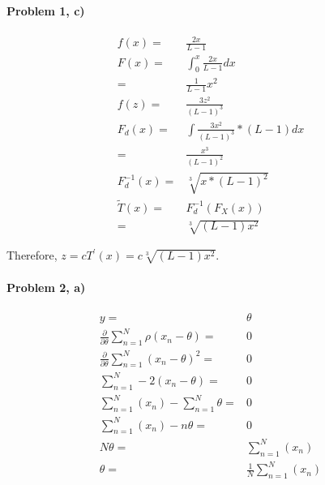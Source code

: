 \documentclass[11pt]{article}
\begin{document}
\paragraph{\noindent\textbf{\LARGE{Problem 1, c)}}}  
\begin{equation*}
\begin{split}
    f(x) = & \frac{2x}{L-1} \\
    F(x) = & \int_0^{x} \frac{2x}{L-1} dx \\
         = & \frac{1}{L-1}x^2 \\
    f(z) = &\frac{3z^2}{(L-1)^3} \\
    F_d(x) = &  \int  \frac{3x^2}{(L-1)^3}* (L-1) dx \\
            = & \frac{x^3}{(L-1)^2} \\
    F_d^{-1}(x) = & \sqrt[3]{x*(L-1)^2 } \\
    \tilde{T}(x) = & F^{-1}_d (F_X(x)) \\
                = & \sqrt[3]{(L-1) x^2} 
\end{split}
\end{equation*}
\begin{flushleft}
    Therefore, $z = cT^\prime(x) = c\sqrt[3]{(L-1) x^2}  $.
\end{flushleft}  

\paragraph{\noindent\textbf{\LARGE{Problem 2, a)}}}  
  
\begin{equation*}
\begin{split}
    y = & \theta \\ 
    \frac{\partial }{\partial \theta} \sum_{n = 1}^{N} \rho(x_n - \theta) = & 0 \\
    \frac{\partial }{\partial \theta} \sum_{n = 1}^{N} (x_n - \theta)^2 = & 0 \\
    \sum_{n = 1}^{N} -2(x_n - \theta) = & 0 \\
    \sum_{n = 1}^{N} (x_n) - \sum_{n = 1}^{N} \theta=  & 0 \\
    \sum_{n = 1}^{N} (x_n) - n \theta=  & 0 \\
    N \theta = & \sum_{n = 1}^{N} (x_n) \\
    \theta = & \frac{1}{N} \sum_{n = 1}^{N} (x_n) 
\end{split}
\end{equation*}
    
\end{document}
